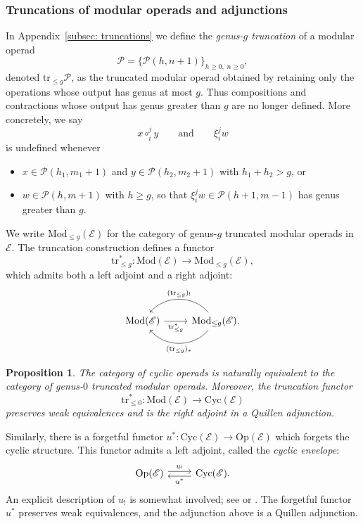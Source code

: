 \documentclass{amsart}
\newcommand{\bE}{\mathscr{E}}
\newcommand{\calP}{\mathcal{P}}
\newcommand{\Mod}{\mathrm{Mod}}
\newcommand{\Cyc}{\mathrm{Cyc}}
\newcommand{\Op}{\mathrm{Op}}
\newcommand{\trun}[1]{\mathrm{tr}_{\leq{#1}}}
\newtheorem{prop}[theorem]{Proposition}%
\theoremstyle{definition}
\numberwithin{equation}{section}
\begin{document}
 

\subsubsection{Truncations of modular operads and adjunctions}\label{subsec: intro to truncations}
In Appendix~\ref{subsec: truncations} we define the \emph{genus-$g$ truncation} of a modular operad
\[
\calP=\{\calP(h,n+1)\}_{h\geq 0,\;n\geq 0},
\]
denoted $\trun{g}\calP$, as the truncated modular operad obtained by retaining only the operations whose output has genus at most $g$. Thus compositions and contractions whose output has genus greater than $g$ are no longer defined. More concretely, we say 
\[
x\circ_i^j y
\qquad\text{and}\qquad
\xi_i^j w
\]
is undefined whenever
\begin{itemize}
\item $x\in\calP(h_1,m_1+1)$ and $y\in\calP(h_2,m_2+1)$ with
$h_1+h_2>g$, or
\item $w\in\calP(h,m+1)$ with $h\geq g$, so that
$\xi_i^j w\in\calP(h+1,m-1)$ has genus greater than $g$.
\end{itemize}
We write $\Mod_{\leq g}(\bE)$ for the category of genus-$g$ truncated modular
operads in $\bE$. The truncation construction defines a functor
\[
\trun{g}^*:\Mod(\bE)\longrightarrow \Mod_{\leq g}(\bE),
\]
which admits both a left adjoint and a right adjoint:
\[
\begin{tikzcd}
\Mod(\bE) \arrow[r, "\trun{g}^*"'] &
\Mod_{\leq g}(\bE)
\arrow[l, bend right=50, "(\trun{g})_!"']
\arrow[l, bend left=50, "(\trun{g})_*"]
.
\end{tikzcd}
\]

\begin{prop}
The category of cyclic operads is naturally equivalent to the category of genus-$0$ truncated modular operads. Moreover, the truncation functor
\[
\trun{0}^*:\Mod(\bE)\longrightarrow \Cyc(\bE)
\]
preserves weak equivalences and is the right adjoint in a Quillen adjunction.
\end{prop}

Similarly, there is a forgetful functor $u^*:\Cyc(\bE)\to \Op(\bE)$ which forgets the cyclic structure. This functor
admits a left adjoint, called the \emph{cyclic envelope}:
\[
\begin{tikzcd}
\Op(\bE)\arrow[r, shift left=1, "u_!"] &
\Cyc(\bE)\arrow[l, shift left=1, "u^*"]
.
\end{tikzcd}
\]
An explicit description of $u_!$ is somewhat involved; see \cite[Section~3.1]{DCH} or \cite[Section~9]{Ward}. The forgetful functor $u^*$ preserves weak equivalences, and the adjunction above is a Quillen adjunction.
\end{document}
